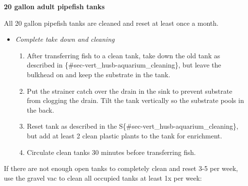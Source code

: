 \documentclass[
  letterpaper,
  DIV=11,
  numbers=noendperiod]{scrreprt}
\providecommand{\tightlist}{%
  \setlength{\itemsep}{0pt}\setlength{\parskip}{0pt}}\usepackage{longtable,booktabs,array}
\begin{document}
\textbf{20 gallon adult pipefish tanks}

\begin{tcolorbox}[enhanced jigsaw, rightrule=.15mm, title=\textcolor{quarto-callout-warning-color}{\faExclamationTriangle}\hspace{0.5em}{NOTES}, titlerule=0mm, opacitybacktitle=0.6, toprule=.15mm, bottomrule=.15mm, opacityback=0, left=2mm, colframe=quarto-callout-warning-color-frame, breakable, coltitle=black, colback=white, colbacktitle=quarto-callout-warning-color!10!white, bottomtitle=1mm, leftrule=.75mm, toptitle=1mm, arc=.35mm]

All 20 gallon pipefish tanks are cleaned and reset at least once a
month.

\end{tcolorbox}

\begin{itemize}
\item
  \emph{Complete take down and cleaning}

  \begin{enumerate}
  \def\labelenumi{\arabic{enumi}.}
  \tightlist
  \item
    After transferring fish to a clean tank, take down the old tank as
    described in \{\#sec-vert\_husb-aquarium\_cleaning\}, but leave the
    bulkhead on and keep the substrate in the tank.
  \item
    Put the strainer catch over the drain in the sink to prevent
    substrate from clogging the drain. Tilt the tank vertically so the
    substrate pools in the back.
  \item
    Reset tank as described in the
    S\{\#sec-vert\_husb-aquarium\_cleaning\}, but add at least 2 clean
    plastic plants to the tank for enrichment.
  \item
    Circulate clean tanks 30 minutes before transferring fish.
  \end{enumerate}
\end{itemize}

\begin{tcolorbox}[enhanced jigsaw, rightrule=.15mm, title=\textcolor{quarto-callout-warning-color}{\faExclamationTriangle}\hspace{0.5em}{NOTES}, titlerule=0mm, opacitybacktitle=0.6, toprule=.15mm, bottomrule=.15mm, opacityback=0, left=2mm, colframe=quarto-callout-warning-color-frame, breakable, coltitle=black, colback=white, colbacktitle=quarto-callout-warning-color!10!white, bottomtitle=1mm, leftrule=.75mm, toptitle=1mm, arc=.35mm]

If there are not enough open tanks to completely clean and reset 3-5 per
week, use the gravel vac to clean all occupied tanks at least 1x per
week:

\end{tcolorbox}
\end{document}
